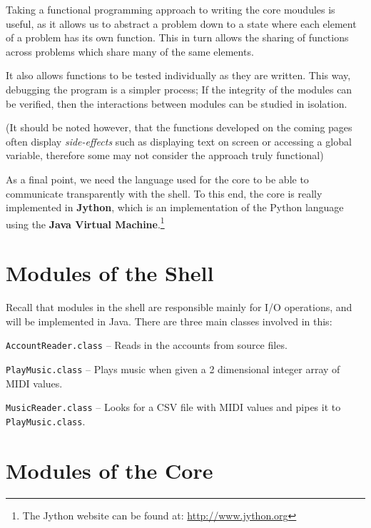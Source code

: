 Taking a functional programming approach to writing the core moudules is useful, as it allows us to abstract a problem down to a state where each element of a problem has its own function. This in turn allows the sharing of functions across problems which share many of the same elements.

It also allows functions to be tested individually as they are written. This way, debugging the program is a simpler process; If the integrity of the modules can be verified, then the interactions between modules can be studied in isolation.

(It should be noted however, that the functions developed on the coming pages often display \textit{side-effects} such as displaying text on screen or accessing a global variable, therefore some may not consider the approach truly functional)

As a final point, we need the language used for the core to be able to communicate transparently with the shell. To this end, the core is really implemented in \textbf{Jython}, which is an implementation of the Python language using the \textbf{Java Virtual Machine}.\footnote{The Jython website can be found at: \url{http://www.jython.org}}

\section{Modules of the Shell}

Recall that modules in the shell are responsible mainly for I/O operations, and will be implemented in Java. There are three main classes involved in this:

\begin{itemize}
\begin{singlespace}
\item \texttt{AccountReader.class} -- Reads in the accounts from source files.
\item \texttt{PlayMusic.class} -- Plays music when given a 2 dimensional integer array of MIDI values.
\item \texttt{MusicReader.class} -- Looks for a CSV file with MIDI values and pipes it to \texttt{PlayMusic.class}.
\end{singlespace}
\end{itemize}

\section{Modules of the Core}

